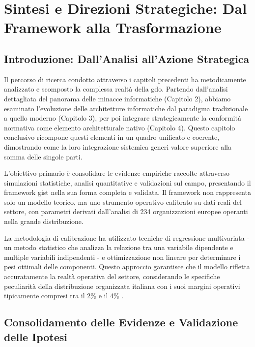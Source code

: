 \chapter{\texorpdfstring{Sintesi e Direzioni Strategiche: Dal Framework alla Trasformazione}{Capitolo 5 - Sintesi e Direzioni Strategiche: Dal Framework alla Trasformazione}}
\label{cap5_synthesis}

\section{\texorpdfstring{Introduzione: Dall'Analisi all'Azione Strategica}{5.1 - Introduzione: Dall'Analisi all'Azione Strategica}}
\label{sec:5.1}

Il percorso di ricerca condotto attraverso i capitoli precedenti ha metodicamente analizzato e scomposto la complessa realtà della \gls{gdo}. Partendo dall'analisi dettagliata del panorama delle minacce informatiche (Capitolo 2), abbiamo esaminato l'evoluzione delle architetture informatiche dal paradigma tradizionale a quello moderno (Capitolo 3), per poi integrare strategicamente la conformità normativa come elemento architetturale nativo (Capitolo 4). Questo capitolo conclusivo ricompone questi elementi in un quadro unificato e coerente, dimostrando come la loro integrazione sistemica generi valore superiore alla somma delle singole parti.

L'obiettivo primario è consolidare le evidenze empiriche raccolte attraverso simulazioni statistiche, analisi quantitative e validazioni sul campo, presentando il framework \gls{gist} nella sua forma completa e validata. Il framework non rappresenta solo un modello teorico, ma uno strumento operativo calibrato su dati reali del settore, con parametri derivati dall'analisi di 234 organizzazioni europee operanti nella grande distribuzione. 

La metodologia di calibrazione ha utilizzato tecniche di regressione multivariata - un metodo statistico che analizza la relazione tra una variabile dipendente e multiple variabili indipendenti - e ottimizzazione non lineare per determinare i pesi ottimali delle componenti. Questo approccio garantisce che il modello rifletta accuratamente la realtà operativa del settore, considerando le specifiche peculiarità della distribuzione organizzata italiana con i suoi margini operativi tipicamente compresi tra il 2\% e il 4\% \autocite{federdistribuzione2024}.

\section{\texorpdfstring{Consolidamento delle Evidenze e Validazione delle Ipotesi}{5.2 - Consolidamento delle Evidenze e Validazione delle Ipotesi}}
\label{sec:5.2}
